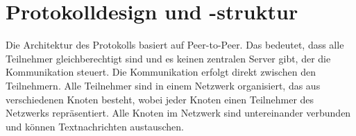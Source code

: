 \section{Protokolldesign und -struktur}


Die Architektur des Protokolls basiert auf Peer-to-Peer. Das bedeutet, dass
alle Teilnehmer gleichberechtigt sind und es keinen zentralen Server gibt, der
die Kommunikation steuert. Die Kommunikation erfolgt direkt zwischen den
Teilnehmern. Alle Teilnehmer sind in einem Netzwerk organisiert, das aus
verschiedenen Knoten besteht, wobei jeder Knoten einen Teilnehmer des Netzwerks repräsentiert.
Alle Knoten im Netzwerk sind untereinander verbunden und können Textnachrichten austauschen.










